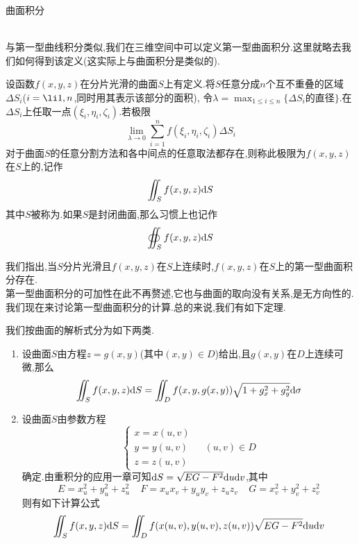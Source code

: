 \documentclass{ctexart}
\begin{document}
\pagestyle{empty}
\begin{center}\large 曲面积分\end{center}
\\
与第一型曲线积分类似,我们在三维空间中可以定义第一型曲面积分.这里就略去我们如何得到该定义(这实际上与曲面积分是类似的).
\begin{definition}[1.1 定义:第一型曲线积分]
    设函数$f(x,y,z)$在分片光滑的曲面$S$上有定义.将$S$任意分成$n$个互不重叠的区域$\Delta S_i$($i=\li 1,n$,同时用其表示该部分的面积),%
    令$\displaystyle\lambda=\max_{1\leqslant i\leqslant n}\{\Delta S_i\text{的直径}\}$.在$\Delta S_i$上任取一点$\left(\xi_i,\eta_i,\zeta_i\right)$.若极限
    \[\lim_{\lambda\to0}\sum_{i=1}^{n}f(\xi_i,\eta_i,\zeta_i)\Delta S_i\]
    对于曲面$S$的任意分割方法和各中间点的任意取法都存在,则称此极限为$f(x,y,z)$在$S$上的,记作
    \[\iint_{S}f(x,y,z)\mathrm{d} S\]
    其中$S$被称为.如果$S$是封闭曲面,那么习惯上也记作
    \[\oiint_{S}f(x,y,z)\mathrm{d} S\]
\end{definition}\noindent
我们指出,当$S$分片光滑且$f(x,y,z)$在$S$上连续时,$f(x,y,z)$在$S$上的第一型曲面积分存在.\\
第一型曲面积分的可加性在此不再赘述,它也与曲面的取向没有关系,是无方向性的.\\
我们现在来讨论第一型曲面积分的计算.总的来说,我们有如下定理.
\begin{formal}[1.2 第一型曲面积分的计算]
    我们按曲面的解析式分为如下两类.
    \begin{enumerate}[label=\tbf{\alph*.}]
        \item 设曲面$S$由方程$z=g(x,y)$(其中$(x,y)\in D$)给出,且$g(x,y)$在$D$上连续可微,那么
            \[\iint_Sf(x,y,z)\mathrm{d} S=\iint_Df(x,y,g(x,y))\sqrt{1+g_x^2+g_y^2}\mathrm{d}\sigma\]
        \item 设曲面$S$由参数方程
            \[\left\{\begin{array}{l}
                x=x(u,v)\\y=y(u,v)\\z=z(u,v)
            \end{array}\right.\ \ \ \ \ (u,v)\in D\]
            确定.由重积分的应用一章可知$\mathrm{d} S=\sqrt{EG-F^2}\mathrm{d} u\mathrm{d} v$,其中
            \[
                E=x_u^2+y_u^2+z_u^2\ \ \ \ \ 
                F=x_ux_v+y_uy_v+z_uz_v\ \ \ \ \ 
                G=x_v^2+y_v^2+z_v^2
            \]
            则有如下计算公式
            \[\iint_Sf(x,y,z)\mathrm{d} S=\iint_Df(x(u,v),y(u,v),z(u,v))\sqrt{EG-F^2}\mathrm{d} u\mathrm{d} v\]
    \end{enumerate}
\end{formal}\noindent
\end{document}
